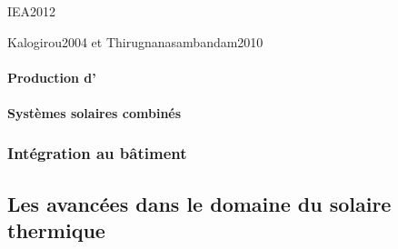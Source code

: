 IEA2012

Kalogirou2004 et Thirugnanasambandam2010

\paragraph{Production d’} %
\label{par:production_d_ecs}


\paragraph{Systèmes solaires combinés} %
\label{par:systèmes_solaires_combines}



\subsubsection{Intégration au bâtiment} %
\label{ssub:integration_au_batiment}


\subsection{Les avancées dans le domaine du solaire thermique} %
\label{sub:les_avancées_dans_le_domaine_du_solaire_thermique}
